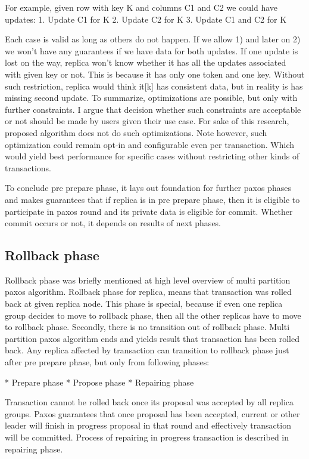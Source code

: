 For example, given row with key K and columns C1 and C2 we could have updates:
1. Update C1 for K
2. Update C2 for K
3. Update C1 and C2 for K


Each case is valid as long as others do not happen. If we allow 1) and later on 2) we won’t have any guarantees if we have data for both updates. If one update is lost on the way, replica won’t know whether it has all the updates associated with given key or not. This is because it has only one token and one key. 
Without such restriction, replica would think it[k] has consistent data, but in reality is has missing second update.
To summarize, optimizations are possible, but only with further constraints. I argue that decision whether such constraints are acceptable or not should be made by users given their use case. For sake of this research, proposed algorithm does not do such optimizations. Note however, such optimization could remain opt-in and configurable even per transaction. Which would yield best performance for specific cases without restricting other kinds of transactions.
        
To conclude pre prepare phase, it lays out foundation for further paxos phases and makes guarantees that if replica is in pre prepare phase, then it is eligible to participate in paxos round and its private data is eligible for commit. Whether commit occurs or not, it depends on results of next phases.


\subsection{Rollback phase}
Rollback phase was briefly mentioned at high level overview of multi partition paxos algorithm. 
Rollback phase for replica, means that transaction was rolled back at given replica node. 
This phase is special, because if even one replica group decides to move to rollback phase, then all the other replicas have to move to rollback phase. Secondly, there is no transition out of rollback phase. Multi partition paxos algorithm ends and yields result that transaction has been rolled back.
Any replica affected by transaction can transition to rollback phase just after pre prepare phase, but only from following phases:


* Prepare phase
* Propose phase
* Repairing phase


Transaction cannot be rolled back once its proposal was accepted by all replica groups. Paxos guarantees that once proposal has been accepted, current or other leader will finish in progress proposal in that round and effectively transaction will be committed. Process of repairing in progress transaction is described in repairing phase.


